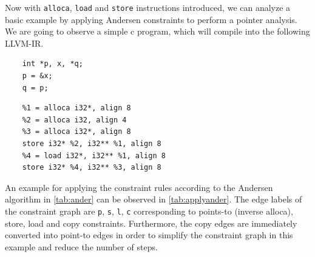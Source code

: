 Now with \verb|alloca|, \verb|load| and \verb|store| instructions introduced, we can analyze a basic example by applying Andersen constraints to perform a pointer analysis.
We are going to observe a simple c program, which will compile into the following LLVM-IR.
\begin{center}
    \begin{minipage}[t]{0.3\textwidth}
        \begin{verbatim}
    int *p, x, *q;
    p = &x;
    q = p;
        \end{verbatim}
    \end{minipage}
    \begin{minipage}[t]{0.6\textwidth}
        \begin{verbatim}
    %1 = alloca i32*, align 8
    %2 = alloca i32, align 4
    %3 = alloca i32*, align 8
    store i32* %2, i32** %1, align 8
    %4 = load i32*, i32** %1, align 8
    store i32* %4, i32** %3, align 8
        \end{verbatim}
    \end{minipage}
\end{center}
An example for applying the constraint rules according to the Andersen algorithm in \autoref{tab:ander} can be observed in \autoref{tab:applyander}.
The edge labels of the constraint graph are \verb|p|, \verb|s|, \verb|l|, \verb|c| corresponding to points-to (inverse alloca), store, load and copy constraints.
Furthermore, the copy edges are immediately converted into point-to edges in order to simplify the constraint graph in this example and reduce the number of steps.
